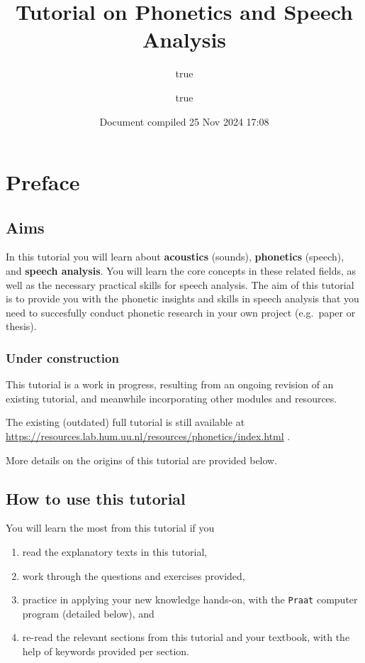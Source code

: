 \documentclass[
]{book}
\title{Tutorial on Phonetics and Speech Analysis}
\author{true \and true}
\date{Document compiled 25 Nov 2024 17:08}
\providecommand{\tightlist}{%
  \setlength{\itemsep}{0pt}\setlength{\parskip}{0pt}}
\begin{document}
\maketitle

{
\setcounter{tocdepth}{1}
\tableofcontents
}
\chapter*{Preface}\label{preface}

\section*{Aims}\label{aims}

In this tutorial you will learn about \textbf{acoustics} (sounds), \textbf{phonetics} (speech), and \textbf{speech analysis}.
You will learn the core concepts in these related fields, as well as the necessary practical skills for speech analysis.
The aim of this tutorial is to provide you with the phonetic insights and skills in speech analysis that you need to succesfully conduct phonetic research in your own project (e.g.~paper or thesis).

\subsection*{Under construction}\label{under-construction}

This tutorial is a work in progress, resulting from an ongoing revision of an existing tutorial, and meanwhile incorporating other modules and resources.

The existing (outdated) full tutorial is still available at \url{https://resources.lab.hum.uu.nl/resources/phonetics/index.html}
.

More details on the origins of this tutorial are provided below.

\section*{How to use this tutorial}\label{how-to-use-this-tutorial}

You will learn the most from this tutorial if you

\begin{enumerate}
\def\labelenumi{(\arabic{enumi})}
\tightlist
\item
  read the explanatory texts in this tutorial,
\item
  work through the questions and exercises provided,
\item
  practice in applying your new knowledge hands-on, with the \texttt{Praat} computer program (detailed below), and
\item
  re-read the relevant sections from this tutorial and your textbook, with the help of keywords provided per section.
\end{enumerate}
\end{document}
